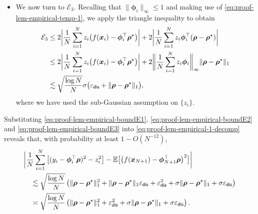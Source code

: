 \documentclass[english]{article}
\begin{document}
\begin{itemize}
\item 
We now turn to $\mathcal{E}_3$. Recalling that $\|{\bm \phi}_i\|_{\infty}\le 1$ 
and making use of \eqref{eq:proof-lem-empirical-temp-1}, we apply the triangle inequality to obtain
%
\begin{align}\label{eq:proof-lem-empirical-boundE3}
\mathcal{E}_3 
&\le 2\bigg|\frac{1}{N}\sum_{i = 1}^N z_i\big(f({\bm x}_i) - {\bm \phi}_i^{\top}{\bm \rho}^{\star}\big)\bigg| + 2\bigg|\frac{1}{N}\sum_{i = 1}^N z_i{\bm \phi}_i^{\top}({\bm \rho}-{\bm \rho}^{\star})\bigg| \notag\\
&\le 2\bigg|\frac{1}{N}\sum_{i = 1}^N z_i\big(f({\bm x}_i) - {\bm \phi}_i^{\top}{\bm \rho}^{\star}\big)\bigg| + 2\bigg\|\frac{1}{N}\sum_{i = 1}^N z_i{\bm \phi}_i\bigg\|_{\infty}\|{\bm \rho}-{\bm \rho}^{\star}\|_1\notag\\
&\lesssim \sqrt{\frac{\log N}{N}}\sigma\big(\varepsilon_{\mathsf{dis}} + \|{\bm \rho}-{\bm \rho}^{\star}\|_1\big),
\end{align}
%
where we have used the sub-Gaussian assumption on $\{z_i\}$. 

\end{itemize}
%
Substituting \eqref{eq:proof-lem-empirical-boundE1}, \eqref{eq:proof-lem-empirical-boundE2} and \eqref{eq:proof-lem-empirical-boundE3} into \eqref{eq:proof-lem-empirical-1-decomp} reveals that, with probability at least $1-O(N^{-12})$, 
%
\begin{align*}
& \bigg|\frac{1}{N}\sum_{i = 1}^N \big[(y_i - {\bm \phi}_i^{\top}{\bm \rho})^2 - z_i^2\big] - \mathbb{E}\big[\big(f({\bm x}_{N+1}) - {\bm \phi}_{N+1}^{\top}{\bm \rho}\big)^2\big]\bigg|\notag\\
&\quad \lesssim \sqrt{\frac{\log N}{N}}\left(\|{\bm \rho}-{\bm \rho}^{\star}\|_1^2 + \|{\bm \rho}-{\bm \rho}^{\star}\|_1\varepsilon_{\mathsf{dis}} + \varepsilon_{\mathsf{dis}}^2 + \sigma\|{\bm \rho}-{\bm \rho}^{\star}\|_1 + \sigma\varepsilon_{\mathsf{dis}}\right)\notag\\
&\quad \asymp \sqrt{\frac{\log N}{N}}\left(\|{\bm \rho}-{\bm \rho}^{\star}\|_1^2 + \varepsilon_{\mathsf{dis}}^2 + \sigma\|{\bm \rho}-{\bm \rho}^{\star}\|_1 + \sigma\varepsilon_{\mathsf{dis}}\right) .
\end{align*}
% 
\end{document}
